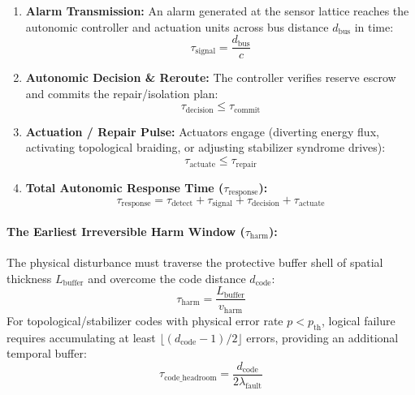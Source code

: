 \documentclass[
]{article}
\providecommand{\tightlist}{%
  \setlength{\itemsep}{0pt}\setlength{\parskip}{0pt}}
\begin{document}
\begin{enumerate}
\def\labelenumi{\arabic{enumi}.}
\tightlist
\item
  \textbf{Alarm Transmission:} An alarm generated at the sensor lattice
  reaches the autonomic controller and actuation units across bus
  distance \(d_{\mathrm{bus}}\) in time:
  \[\tau_{\mathrm{signal}} = \frac{d_{\mathrm{bus}}}{c}\]
\item
  \textbf{Autonomic Decision \& Reroute:} The controller verifies
  reserve escrow and commits the
  r\allowbreak{}e\allowbreak{}p\allowbreak{}a\allowbreak{}i\allowbreak{}r\allowbreak{}/\allowbreak{}i\allowbreak{}s\allowbreak{}o\allowbreak{}l\allowbreak{}a\allowbreak{}t\allowbreak{}i\allowbreak{}o\allowbreak{}n
  plan: \[\tau_{\mathrm{decision}} \le \tau_{\mathrm{commit}}\]
\item
  \textbf{Actuation / Repair Pulse:} Actuators engage (diverting energy
  flux, activating topological braiding, or adjusting stabilizer
  syndrome drives):
  \[\tau_{\mathrm{actuate}} \le \tau_{\mathrm{repair}}\]
\item
  \textbf{Total Autonomic Response Time (\(\tau_{\mathrm{response}}\)):}
  \[\tau_{\mathrm{response}} = \tau_{\mathrm{detect}} + \tau_{\mathrm{signal}} + \tau_{\mathrm{decision}} + \tau_{\mathrm{actuate}}\]
\end{enumerate}

\paragraph{\texorpdfstring{The Earliest Irreversible Harm Window
(\(\tau_{\mathrm{harm}}\)):}{The Earliest Irreversible Harm Window (\textbackslash tau\_\{\textbackslash mathrm\{harm\}\}):}}\label{the-earliest-irreversible-harm-window-tau_mathrmharm}

The physical disturbance must traverse the protective buffer shell of
spatial thickness \(L_{\mathrm{buffer}}\) and overcome the code distance
\(d_{\mathrm{code}}\):
\[\tau_{\mathrm{harm}} = \frac{L_{\mathrm{buffer}}}{v_{\mathrm{harm}}}\]
For
t\allowbreak{}o\allowbreak{}p\allowbreak{}o\allowbreak{}l\allowbreak{}o\allowbreak{}g\allowbreak{}i\allowbreak{}c\allowbreak{}a\allowbreak{}l\allowbreak{}/\allowbreak{}s\allowbreak{}t\allowbreak{}a\allowbreak{}b\allowbreak{}i\allowbreak{}l\allowbreak{}i\allowbreak{}z\allowbreak{}e\allowbreak{}r
codes with physical error rate \(p < p_{\mathrm{th}}\), logical failure
requires accumulating at least
\(\lfloor(d_{\mathrm{code}} - 1)/2\rfloor\) errors, providing an
additional temporal buffer:
\[\tau_{\mathrm{code\_headroom}} = \frac{d_{\mathrm{code}}}{2 \lambda_{\mathrm{fault}}}\]
\end{document}
